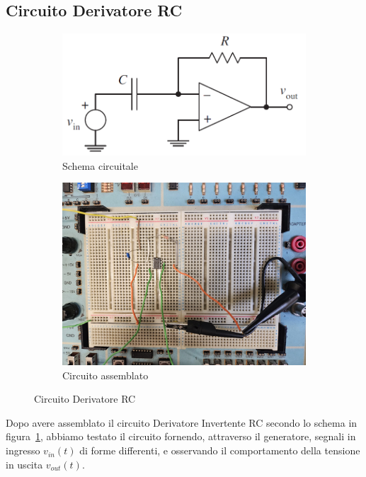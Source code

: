 \documentclass[a4paper,12pt]{article}
\begin{document}
\subsection{Circuito Derivatore RC} \label{sec: rc} 
\begin{figure}[H]
  \centering
  \begin{subfigure}{0.45\textwidth}
    \includegraphics[width=\linewidth]{Schematic_derivatore.png}
    \caption{Schema circuitale}
  \end{subfigure}
  \hspace{0.05\textwidth}
  \begin{subfigure}{0.45\textwidth}
    \includegraphics[width=\linewidth]{Derivatore_montato.jpg}
    \caption{Circuito assemblato}
  \end{subfigure}
  \caption{Circuito Derivatore RC}
  \label{fig: derivatore}
\end{figure}

Dopo avere assemblato il circuito Derivatore Invertente RC secondo lo schema in figura~\ref{fig: derivatore}, abbiamo testato il circuito fornendo, attraverso il generatore, segnali in ingresso \(v_{in}(t)\) di forme differenti, e osservando il comportamento della tensione in uscita \(v_{out}(t)\).
\end{document}
